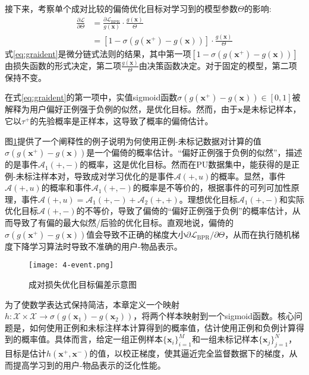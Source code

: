 接下来，考察单个成对比较的偏倚优化目标对学习到的模型参数$\Theta$的影响:
\begin{align}
	\frac{\partial \mathcal{L}}{\partial \Theta} &= \frac{\partial \mathcal{L}_\text{BPR}}{g(\mathbf{x})}\cdot\frac{g(\mathbf{x})}{\Theta}  \\
	&= [1-\sigma(g(\mathbf{x}^+) - g(\mathbf{x})) ]\cdot\frac{g(\mathbf{x})}{\Theta}  \label{eq:graident}
\end{align}
式\eqref{eq:graident}是微分链式法则的结果，其中第一项$[1-\sigma(g(\mathbf{x}^+) - g(\mathbf{x}))]$由损失函数的形式决定，第二项$\frac{g(\mathbf{x})}{\Theta}$由决策函数决定。对于固定的模型，第二项保持不变。

在式\eqref{eq:graident}的第一项中，实值sigmoid函数$\sigma(g(\mathbf{x}^+) - g(\mathbf{x})) \in [0,1]$被解释为用户偏好正例强于负例的似然\cite{Steffen:2009:UAI}，是优化目标。然而，由于$\mathbf{x}$是未标记样本，它以$\tau^+$的先验概率是正样本，这导致了概率的偏倚估计。

图\ref{fig:event}提供了一个阐释性的例子说明为何使用正例-未标记数据对计算的值$\sigma(g(\mathbf{x}^+) - g(\mathbf{x}))$是一个偏倚的概率估计。“偏好正例强于负例的似然”，描述的是事件$\mathcal{A}_1(+,-)$的概率，这是优化目标。然而在PU数据集中，能获得的是正例-未标注样本对，导致成对学习优化的是事件$\mathcal{A}(+,u)$的概率。显然，事件$\mathcal{A}(+,u)$的概率和事件$\mathcal{A}_1(+,-)$的概率是不等价的，根据事件的可列可加性原理，事件$\mathcal{A}(+,u) = \mathcal{A}_1(+,-) + \mathcal{A}_2(+,+)$。理想优化目标$\mathcal{A}_1(+,-)$和实际优化目标$\mathcal{A}(+,-)$的不等价，导致了偏倚的“偏好正例强于负例”的概率估计，从而导致了有偏的最大似然/后验的优化目标。直观地说，偏倚的$\sigma(g(\mathbf{x}^+) - g(\mathbf{x}))$值会导致不正确的梯度大小${\partial \mathcal{L}_\text{BPR}}/{\partial \Theta}$，从而在执行随机梯度下降学习算法时导致不准确的用户-物品表示。
\begin{figure}[h!]
	\centering
	\texttt{[image: 4-event.png]}
	\caption{成对损失优化目标偏差示意图} 
	\label{fig:event}
\end{figure}

为了使数学表达式保持简洁，本章定义一个映射$h: \mathcal{X}\times\mathcal{X} \rightarrow \sigma(g(\mathbf{x}_1) - g(\mathbf{x}_2))$，将两个样本映射到一个sigmoid函数。核心问题是，如何使用正例和未标注样本计算得到的概率值，估计使用正例和负例计算得到的概率值。具体而言，给定一组正例样本$\{\mathbf{x}_i\}_{i=1}^M$和一组未标记样本$\{\mathbf{x}_j\}_{j=1}^N$，目标是估计$h(\mathbf{x}^+,\mathbf{x}^-)$的值，以校正梯度，使其逼近完全监督数据下的梯度，从而提高学习到的用户-物品表示的泛化性能。

